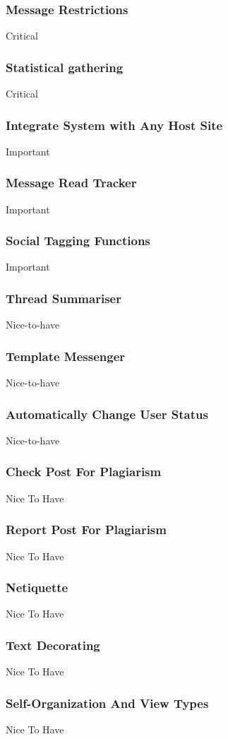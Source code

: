 \documentclass[hidelinks, 12pt, oneside]{article}
\begin{document}
\subsubsection{Message Restrictions}
Critical
\subsubsection{Statistical gathering}
Critical
\subsubsection{Integrate System with Any Host Site}
Important
\subsubsection{Message Read Tracker}
Important
\subsubsection{Social Tagging Functions}
Important
\subsubsection{Thread Summariser}
Nice-to-have
\subsubsection{Template Messenger}
Nice-to-have
\subsubsection{Automatically Change User Status}
Nice-to-have
\subsubsection{Check Post For Plagiarism}
Nice To Have
\subsubsection{Report Post For Plagiarism}
Nice To Have
\subsubsection{Netiquette}
Nice To Have
\subsubsection{Text Decorating}
Nice To Have
\subsubsection{Self-Organization And View Types}
Nice To Have
\end{document}
